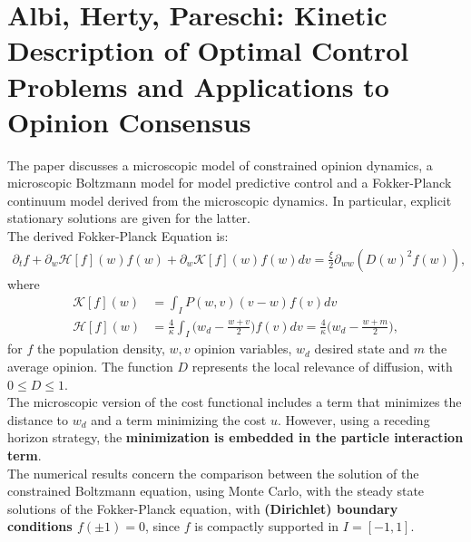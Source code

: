 \documentclass[11pt, a4paper]{article}
\theoremstyle{definition}
\begin{document}
\section{Albi, Herty, Pareschi: Kinetic Description of Optimal Control Problems and Applications to Opinion Consensus \cite{albi2014kinetic}}
The paper discusses a microscopic model of constrained opinion dynamics, a microscopic Boltzmann model for model predictive control and a Fokker-Planck continuum model derived from the microscopic dynamics. In particular, explicit stationary solutions are given for the latter.\\
The derived Fokker-Planck Equation is:
\begin{align*}
\partial_t f + \partial_w \mathcal{H}[f](w)f(w) + \partial_w\mathcal{K}[f](w)f(w) dv = \frac{\xi}{2}\partial_{ww}(D(w)^2 f(w)),
\end{align*}
where
\begin{align*}
\mathcal{K}[f](w) &= \int_I P(w,v)(v-w)f(v) dv\\
\mathcal{H}[f](w) &= \frac{4}{\kappa} \int_I \bigg(w_d -\frac{w+v}{2}\bigg)f(v)dv =\frac{4}{\kappa} \bigg(w_d -\frac{w+m}{2}\bigg),
\end{align*}
for $f$ the population density, $w,v$ opinion variables, $w_d$ desired state and $m$ the average opinion. The function $D$ represents the local relevance of diffusion, with $0\leq D \leq 1$. \\
The microscopic version of the cost functional includes a term that minimizes the distance to $w_d$ and a term minimizing the cost $u$. However, using a receding horizon strategy, the \textbf{minimization is embedded in the particle interaction term}.
\\
The numerical results concern the comparison between the solution of the constrained Boltzmann equation, using Monte Carlo, with the steady state solutions of the Fokker-Planck equation, with \textbf{(Dirichlet) boundary conditions $f(\pm1)=0$}, since $f$ is compactly supported in $I=[-1,1]$.
\end{document}
